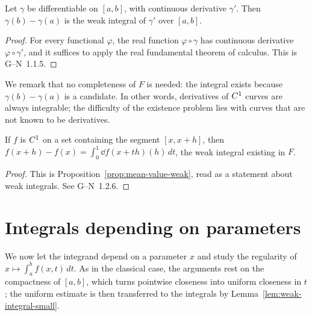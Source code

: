 \begin{theorem}
  \label{thm:ftc1}
  \leanok
  Let $\gamma$ be differentiable on $[a, b]$, with continuous derivative $\gamma'$. Then
  $\gamma(b) - \gamma(a)$ is the weak integral of $\gamma'$ over $[a, b]$.
\end{theorem}

\begin{proof}
  \leanok
  For every functional $\varphi$, the real function $\varphi \circ \gamma$ has continuous
  derivative $\varphi \circ \gamma'$, and it suffices to apply the real fundamental theorem of
  calculus. This is G--N~1.1.5.
\end{proof}

We remark that no completeness of $F$ is needed: the integral exists because
$\gamma(b) - \gamma(a)$ is a candidate. In other words, derivatives of $C^{1}$ curves are
always integrable; the difficulty of the existence problem lies with curves that are not known
to be derivatives.

\begin{corollary}
  \label{cor:ftc-segment}
  \leanok
  If $f$ is $C^{1}$ on a set containing the segment $[x, x + h]$, then
  $f(x + h) - f(x) = \int_0^1 \dd f(x + th)(h)\, dt$, the weak integral existing in $F$.
\end{corollary}

\begin{proof}
  \leanok
  This is Proposition~\ref{prop:mean-value-weak}, read as a statement about weak integrals.
  See G--N~1.2.6.
\end{proof}

\section{Integrals depending on parameters}

We now let the integrand depend on a parameter $x$ and study the regularity of
$x \mapsto \int_a^b f(x, t)\, dt$. As in the classical case, the arguments rest on the
compactness of $[a, b]$, which turns pointwise closeness into uniform closeness in $t$; the
uniform estimate is then transferred to the integrals by
Lemma~\ref{lem:weak-integral-small}.

